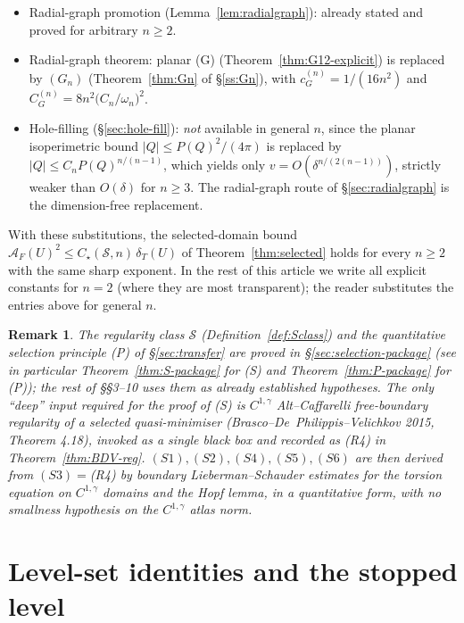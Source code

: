 \documentclass[11pt]{amsart}
\newtheorem{remark}[theorem]{Remark}
\newcommand{\dT}{\delta_T}
\newcommand{\AF}{\mathcal A_F}
\newcommand{\Sclass}{\mathcal S}
\begin{document}
\begin{itemize}[leftmargin=2em]
and the chart radius (both controlled by $\Sclass$).
\item Radial-graph promotion (Lemma~\ref{lem:radialgraph}): already
stated and proved for arbitrary $n\ge 2$.
\item Radial-graph theorem: planar (G) (Theorem~\ref{thm:G12-explicit})
is replaced by $(G_n)$ (Theorem~\ref{thm:Gn} of \S\ref{ss:Gn}),
with $c_G^{(n)}=1/(16 n^{2})$ and $C_G^{(n)}=8 n^{2}\bigl(C_n/
\omega_n\bigr)^{2}$.
\item Hole-filling (\S\ref{sec:hole-fill}): \emph{not} available in
general $n$, since the planar isoperimetric bound $|Q|\le P(Q)^{2}/
(4\pi)$ is replaced by $|Q|\le C_n P(Q)^{n/(n-1)}$, which yields
only $v=O(\delta^{n/(2(n-1))})$, strictly weaker than $O(\delta)$
for $n\ge 3$.  The radial-graph route of \S\ref{sec:radialgraph}
is the dimension-free replacement.
\end{itemize}

With these substitutions, the selected-domain bound
$\AF(U)^{2}\le C_\star(\Sclass,n)\,\dT(U)$ of
Theorem~\ref{thm:selected} holds for every $n\ge 2$ with the same
sharp exponent.  In the rest of this article we write all explicit
constants for $n=2$ (where they are most transparent); the reader
substitutes the entries above for general $n$.

\begin{remark}\label{rem:Plan1}
The regularity class $\Sclass$ (Definition~\ref{def:Sclass}) and the
quantitative selection principle (P) of \S\ref{sec:transfer} are
\emph{proved in \S\ref{sec:selection-package}} (see in particular
Theorem~\ref{thm:S-package} for (S) and Theorem~\ref{thm:P-package}
for (P)); the rest of \S\S3--10 uses them as already established
hypotheses.  The only ``deep'' input required for the proof of (S)
is $C^{1,\gamma}$ Alt--Caffarelli free-boundary regularity of a
selected quasi-minimiser (Brasco--De~Philippis--Velichkov 2015,
Theorem 4.18), invoked as a single black box and recorded as (R4) in
Theorem~\ref{thm:BDV-reg}.  $(S1),(S2),(S4),(S5),(S6)$ are then
derived from $(S3)=$(R4) by boundary Lieberman--Schauder estimates
for the torsion equation on $C^{1,\gamma}$ domains and the Hopf
lemma, in a quantitative form, with no smallness hypothesis on the
$C^{1,\gamma}$ atlas norm.
\end{remark}

\section{Level-set identities and the stopped level}\label{sec:level-id}
\end{document}
